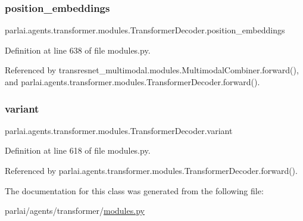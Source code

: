 \subsubsection{\texorpdfstring{position\+\_\+embeddings}{position\_embeddings}}
{\footnotesize\ttfamily parlai.\+agents.\+transformer.\+modules.\+Transformer\+Decoder.\+position\+\_\+embeddings}



Definition at line 638 of file modules.\+py.



Referenced by transresnet\+\_\+multimodal.\+modules.\+Multimodal\+Combiner.\+forward(), and parlai.\+agents.\+transformer.\+modules.\+Transformer\+Decoder.\+forward().

\mbox{\label{classparlai_1_1agents_1_1transformer_1_1modules_1_1TransformerDecoder_a84349da2592ce07a34257a3995dd2254}} 
\subsubsection{\texorpdfstring{variant}{variant}}
{\footnotesize\ttfamily parlai.\+agents.\+transformer.\+modules.\+Transformer\+Decoder.\+variant}



Definition at line 618 of file modules.\+py.



Referenced by parlai.\+agents.\+transformer.\+modules.\+Transformer\+Decoder.\+forward().



The documentation for this class was generated from the following file\+:\begin{DoxyCompactItemize}
\item 
parlai/agents/transformer/\hyperlink{parlai_2agents_2transformer_2modules_8py}{modules.\+py}\end{DoxyCompactItemize}

